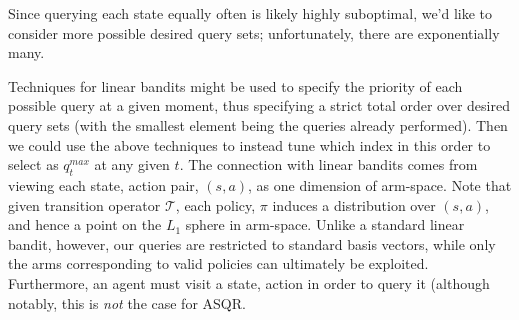 \documentclass{article}
\begin{document}
Since querying each state equally often is likely highly suboptimal, we'd like to consider more possible desired query sets; unfortunately, there are exponentially many.

Techniques for linear bandits might be used to specify the priority of each possible query at a given moment, thus specifying a strict total order over desired query sets (with the smallest element being the queries already performed).
Then we could use the above techniques to instead tune which index in this order to select as $q^{max}_t$ at any given $t$.
The connection with linear bandits comes from viewing each state, action pair, $(s,a)$, as one dimension of arm-space.
Note that given transition operator $\mathcal{T}$, each policy, $\pi$ induces a distribution over $(s,a)$, and hence a point on the $L_1$ sphere in arm-space.
Unlike a standard linear bandit, however, our queries are restricted to standard basis vectors, while only the arms corresponding to valid policies can ultimately be exploited.
Furthermore, an agent must visit a state, action in order to query it (although notably, this is \emph{not} the case for ASQR.

% 





%

\end{document}
